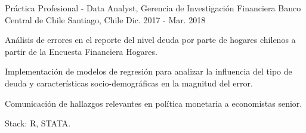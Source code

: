 \begin{cventries}


  \cventry
    {Práctica Profesional - Data Analyst, Gerencia de Investigación Financiera} %
    {Banco Central de Chile} %
    {Santiago, Chile} %
    {Dic. 2017 - Mar. 2018} %
    {
      \begin{cvitems} %
        \item {Análisis de errores en el reporte del nivel deuda por parte de hogares chilenos a partir de la Encuesta Financiera Hogares.}
        \item {Implementación de modelos de regresión para analizar la influencia del tipo de deuda y características socio-demográficas en la magnitud del error.}
        \item {Comunicación de hallazgos relevantes en política monetaria a economistas senior.}
        \item {Stack: R, STATA.}
      \end{cvitems}
    }
\end{cventries}

